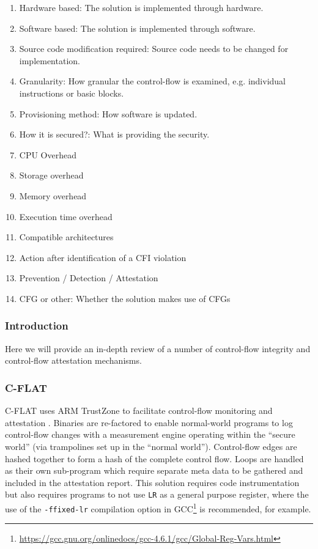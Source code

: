 \begin{enumerate}[label=(\arabic*),noitemsep]
	\item Hardware based: The solution is implemented through hardware.
	\item Software based: The solution is implemented through software.
	\item Source code modification required: Source code needs to be changed for implementation.
	\item Granularity: How granular the control-flow is examined, e.g. individual instructions or basic blocks.
	\item Provisioning method: How software is updated.
	\item How it is secured?: What is providing the security.
	\item CPU Overhead
	\item Storage overhead
	\item Memory overhead
	\item Execution time overhead
	\item Compatible architectures
	\item Action after identification of a CFI violation
	\item Prevention / Detection / Attestation
	\item CFG or other: Whether the solution makes use of CFGs
\end{enumerate}

\subsubsection{Introduction}

Here we will provide an in-depth review of a number of control-flow integrity and control-flow attestation mechanisms.

\subsubsection{C-FLAT}
C-FLAT uses ARM TrustZone to facilitate control-flow monitoring and attestation \cite{Abera2016}. Binaries are re-factored to enable normal-world programs to log control-flow changes with a measurement engine operating within the ``secure world'' (via trampolines set up in the ``normal world''). Control-flow edges are hashed together to form a hash of the complete control flow. Loops are handled as their own sub-program which require separate meta data to be gathered and included in the attestation report. This solution requires code instrumentation but also requires programs to not use \verb|LR| as a general purpose register, where the use of the \verb|-ffixed-lr| compilation option in GCC\footnote{\url{https://gcc.gnu.org/onlinedocs/gcc-4.6.1/gcc/Global-Reg-Vars.html}} is recommended, for example.

